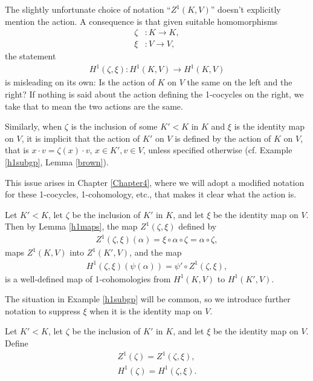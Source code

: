 \begin{remark}
	The slightly unfortunate choice of notation ``$Z^1(K, V)$'' doesn't explicitly mention the action. A consequence is that given suitable homomorphisms
	\begin{align*}
		\zeta&:K \rightarrow K, \\
		\xi&: V \rightarrow V,
	\end{align*}
	the statement
	\begin{align*}
		H^1(\zeta, \xi):H^1(K, V) \rightarrow H^1(K, V)
	\end{align*}
	is misleading on its own: Is the action of $K$ on $V$ the same on the left and the right? If nothing is said about the action defining the 1-cocycles on the right, we take that to mean the two actions are the same.

	Similarly, when $\zeta$ is the inclusion of some $K' < K$ in $K$ and $\xi$ is the identity map on $V$, it is implicit that the action of $K'$ on $V$ is defined by the action of $K$ on $V$, that is $x \cdot v = \zeta(x) \cdot v$, $x \in K', v \in V$, unless specified otherwise (cf. Example \ref{h1subgp}, Lemma \ref{brown}).

This issue arises in Chapter \ref{Chapter4}, where we will adopt a modified notation for these 1-cocycles, 1-cohomology, etc., that makes it clear what the action is.
\end{remark}

\begin{example} \label{h1subgp}
	Let $K' < K$, let $\zeta$ be the inclusion of $K'$ in $K$, and let $\xi$ be the identity map on $V$. Then by Lemma \ref{h1maps}, the map $Z^1(\zeta, \xi)$ defined by
\begin{align*}
	Z^1(\zeta, \xi)(\alpha) = \xi \circ \alpha \circ \zeta = \alpha \circ \zeta,
\end{align*}
maps $Z^1(K, V)$ into $Z^1(K', V)$, and the map
\begin{align*}
	H^1(\zeta, \xi)(\psi(\alpha)) = \psi' \circ Z^1(\zeta, \xi),
\end{align*}
is a well-defined map of 1-cohomologies from $H^1(K, V)$ to $H^1(K', V)$. 
\end{example}

The situation in Example \ref{h1subgp} will be common, so we introduce further notation to suppress $\xi$ when it is the identity map on $V$.
\begin{definition} Let $K' < K$, let $\zeta$ be the inclusion of $K'$ in $K$, and let $\xi$ be the identity map on $V$. Define
\begin{align*}
	Z^1(\zeta) = Z^1(\zeta, \xi), \\
	H^1(\zeta) = H^1(\zeta, \xi).
\end{align*}
\end{definition}

